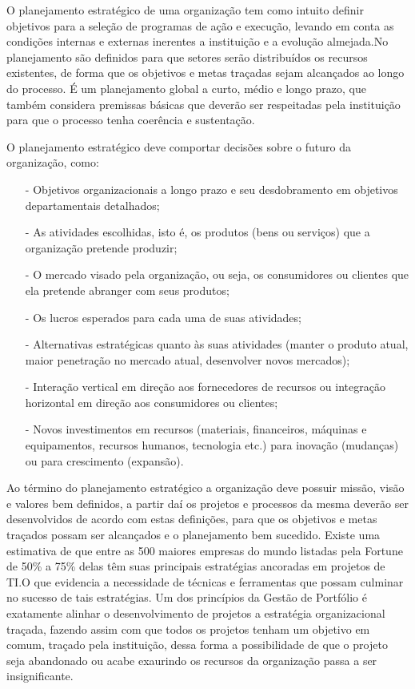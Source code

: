 \documentclass[a4paper,10pt]{article}
\begin{document}
O planejamento estratégico de uma organização tem como intuito definir objetivos para a seleção de programas de ação e execução, levando em conta as condições
internas e externas inerentes a instituição e a evolução almejada.No planejamento são definidos para que setores serão distribuídos os recursos existentes, de forma que os objetivos e metas traçadas sejam alcançados
ao longo do processo. É um planejamento global a curto, médio e longo prazo, que também  considera premissas básicas que deverão ser respeitadas pela instituição para que o processo tenha coerência e sustentação.

O planejamento estratégico deve comportar decisões sobre o futuro da organização, como:
\flushleft
\begin{itemize}	
\item[-] Objetivos organizacionais a longo prazo e seu desdobramento em objetivos	 departamentais detalhados; 
\item[-] As atividades escolhidas, isto é, os produtos (bens ou serviços) que a organização pretende produzir;
\item[-] O mercado visado pela organização, ou seja, os consumidores ou clientes que ela pretende abranger com seus produtos;
\item[-] Os lucros esperados para cada uma de suas atividades;
\item[-] Alternativas estratégicas quanto às suas atividades (manter o produto atual, maior penetração no mercado atual, desenvolver novos mercados);
\item[-] Interação vertical em direção aos fornecedores de recursos ou integração horizontal em direção aos consumidores ou clientes;
\item[-] Novos investimentos em recursos (materiais, financeiros, máquinas e equipamentos, recursos humanos, tecnologia etc.) para inovação (mudanças) ou para crescimento (expansão).
\end{itemize}
\flushleft
Ao término do planejamento estratégico a organização deve possuir missão, visão e valores bem definidos, a partir daí os projetos e processos da mesma
deverão ser desenvolvidos de acordo com estas definições, para que os objetivos e metas traçados possam ser alcançados e o planejamento bem sucedido.
\flushleft
Existe uma estimativa de que entre as 500 maiores empresas do mundo listadas pela Fortune de 50\% a 75\% delas têm suas principais estratégias ancoradas em projetos de TI.O que evidencia
a necessidade de técnicas e ferramentas que possam culminar no sucesso de tais estratégias. Um dos princípios da Gestão de Portfólio é exatamente alinhar o desenvolvimento
de projetos a estratégia organizacional traçada, fazendo assim com que todos os projetos tenham um objetivo em comum, traçado pela instituição, 
dessa forma a possibilidade de que o projeto seja abandonado ou acabe exaurindo os recursos da organização passa a ser insignificante. 
\end{document}
